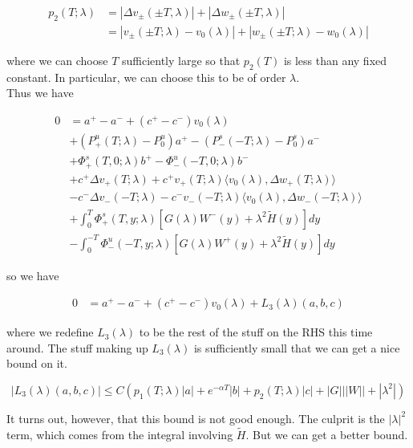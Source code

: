 \documentclass[12pt]{article}
\begin{document}
\begin{enumerate}
\begin{align*}
p_2(T; \lambda) &= |\Delta v_\pm(\pm T, \lambda)| + |\Delta w_\pm(\pm T, \lambda)|\\
&= |v_\pm(\pm T; \lambda) - v_0(\lambda)| + |w_\pm(\pm T; \lambda) - w_0(\lambda)|
\end{align*}

where we can choose $T$ sufficiently large so that $p_2(T)$ is less than any fixed constant. In particular, we can choose this to be of order $\lambda$.\\

Thus we have

\begin{align*}
0 &= a^+ - a^- + (c^+ - c^-)v_0(\lambda) \\
&+ (P^u_+(T; \lambda) - P_0^u)a^+ - (P^s_-(-T; \lambda) - P_0^s)a^- \\
&+ \Phi^s_+(T, 0; \lambda)b^+ - \Phi^u_-(-T, 0; \lambda)b^- \\
&+ c^+ \Delta v_+(T; \lambda) + c^+ v_+(T; \lambda) \langle v_0(\lambda), \Delta w_+(T; \lambda) \rangle \\
&- c^- \Delta v_-(-T; \lambda) - c^- v_-(-T; \lambda) \langle v_0(\lambda), \Delta w_-(-T; \lambda) \rangle \\
&+ \int_0^{T} \Phi^s_+(T, y; \lambda) [ G(\lambda)W^-(y) + \lambda^2 \tilde{H}(y) ] dy \\
&- \int_0^{-T} \Phi^u_-(-T, y; \lambda) [ G(\lambda)W^+(y) + \lambda^2 \tilde{H}(y) ] dy
\end{align*}

so we have

\begin{align*}
0 &= a^+ - a^- + (c^+ - c^-)v_0(\lambda) + L_3(\lambda)(a, b, c)
\end{align*}

where we redefine $L_3(\lambda)$ to be the rest of the stuff on the RHS this time around. The stuff making up $L_3(\lambda)$ is sufficiently small that we can get a nice bound on it. 

\[
|L_3(\lambda)(a, b, c)| \leq C ( p_1(T; \lambda)|a|
+ e^{-\alpha T}|b| + p_2(T; \lambda)|c| + |G|||W|| + |\lambda^2| )
\]

It turns out, however, that this bound is not good enough. The culprit is the $|\lambda|^2$ term, which comes from the integral involving $\tilde{H}$. But we can get a better bound.


\end{enumerate}
\end{document}
